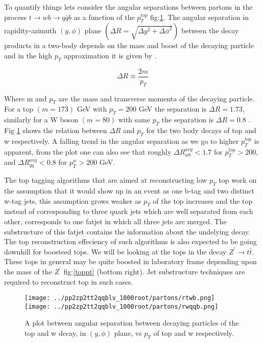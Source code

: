 \documentclass[12pt,a4paper]{article}		%
\begin{document}
To quantify things lets consider the angular separations between partons in the process $ t \to w b \to q \bar{q} b$ as a function of the $p_T^{top}$ fig:\ref{rwbt}. The angular separation in rapidity-azimuth $(y, \phi)$ plane $\left(  \Delta R = \sqrt{\Delta y^2 + \Delta \phi^2} \right)$ between the decay products  in a two-body depends on the mass and boost of the decaying particle and in the high $p_T$ approximation it is given by .

\begin{equation}
 \Delta R \approx \frac{2m}{p_T}
\end{equation} 

Where m and $p_T$ are the mass and transverse momenta of the decaying particle. For a top $(m = 173)$ GeV \cite{pdg-top} with $p_T = 200$ GeV the separation is $\Delta R = 1.73 $, similarly for a W boson $(m = 80)$ \cite{pdg-w} with same $p_T$ the separation is $\Delta R = 0.8$ . Fig \ref{rwbt} shows the relation between $\Delta R $ and $p_T$ for the two body decays of top and w respectively. A falling trend in the angular separation as we go to higher $p_T^{top}$  is apparent, from the plot one can also see that roughly $\Delta R_{wb}^{avg} < 1.7$ for $p_T^{top} > 200$, and $\Delta R_{qq}^{avg}< 0.8 $ for $p_T^{w} > 200$ GeV.   

The top tagging algorithms that are aimed at reconstructing low $p_T$ top work on the assumption that it would show up in an event as one b-tag and two distinct w-tag jets, this assumption grows weaker as $p_T$ of the top increases and the top instead of corresponding to three quark jets which are well separated from each other, corresponds to one fatjet in which all three jets are merged. The substructure of this fatjet contains the information about the undelying decay.  The top reconstruction effeciency of such algorithms is also expected to be going downhill for boosteed tops. We will be looking at the tops in the decay $Z^\prime \to t \bar{t}$. These tops in general may be quite boosted in laboratory frame depending upon the mass of the $Z^\prime$ fig:\ref{toppt} (bottom right). Jet substructure techniques are required to reconstruct top in such cases.  
   


\newpage
 	\begin{figure}[h]
 		\begin{centering}	
 			\texttt{[image: ../pp2zp2tt2qqblv\_1000root/partons/rtwb.png]} 
 			\texttt{[image: ../pp2zp2tt2qqblv\_1000root/partons/rwqqb.png]}
 			\caption{A plot between angular separation between decaying particles of the top and w decay, in $(y,\phi)$ plane,  vs $p_T$ of top and w respectively.}
 			\label{rwbt}
 			\centering
 		\end{centering} 		
 	\end{figure}   
 
\end{document}

